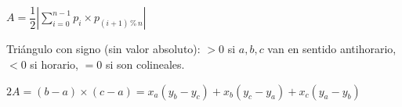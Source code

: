\begin{center}
$A = \dfrac{1}{2}\left|\sum_{i=0}^{n-1} p_i \times p_{(i+1)\,\%\,n}\right|$
\end{center}
Triángulo con signo (sin valor absoluto): $>0$ si $a,b,c$ van en sentido antihorario, $<0$ si horario, $=0$ si son colineales.
\begin{center}
$2A = (b-a)\times(c-a) = x_a(y_b-y_c) + x_b(y_c-y_a) + x_c(y_a-y_b)$
\end{center}
